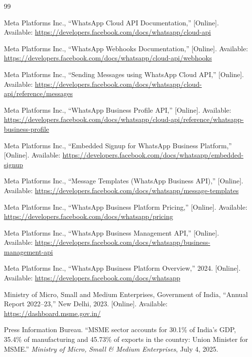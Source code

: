 \documentclass[12pt,a4paper]{report}
\begin{document}
\newpage
\begin{thebibliography}{99}

Meta Platforms Inc.,
``WhatsApp Cloud API Documentation,''
[Online]. Available: \url{https://developers.facebook.com/docs/whatsapp/cloud-api}

Meta Platforms Inc.,
``WhatsApp Webhooks Documentation,''
[Online]. Available: \url{https://developers.facebook.com/docs/whatsapp/cloud-api/webhooks}

Meta Platforms Inc.,
``Sending Messages using WhatsApp Cloud API,''
[Online]. Available: \url{https://developers.facebook.com/docs/whatsapp/cloud-api/reference/messages}

Meta Platforms Inc.,
``WhatsApp Business Profile API,''
[Online]. Available: \url{https://developers.facebook.com/docs/whatsapp/cloud-api/reference/whatsapp-business-profile}

Meta Platforms Inc.,
``Embedded Signup for WhatsApp Business Platform,''
[Online]. Available: \url{https://developers.facebook.com/docs/whatsapp/embedded-signup}

Meta Platforms Inc.,
``Message Templates (WhatsApp Business API),''
[Online]. Available: \url{https://developers.facebook.com/docs/whatsapp/message-templates}

Meta Platforms Inc.,
``WhatsApp Business Platform Pricing,''
[Online]. Available: \url{https://developers.facebook.com/docs/whatsapp/pricing}

Meta Platforms Inc.,
``WhatsApp Business Management API,''
[Online]. Available: \url{https://developers.facebook.com/docs/whatsapp/business-management-api}

Meta Platforms Inc., 
``WhatsApp Business Platform Overview,'' 
2024. [Online]. Available: \url{https://developers.facebook.com/docs/whatsapp}

Ministry of Micro, Small and Medium Enterprises, Government of India, 
``Annual Report 2022--23,'' 
New Delhi, 2023. [Online]. Available: \url{https://dashboard.msme.gov.in/}

Press Information Bureau. ``MSME sector accounts for 30.1\% of India's GDP, 35.4\% of manufacturing and 45.73\% of exports in the country: Union Minister for MSME.'' \textit{Ministry of Micro, Small \& Medium Enterprises}, July 4, 2025.


\end{thebibliography}
\end{document}
